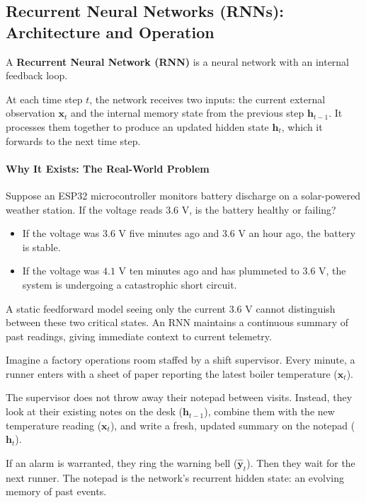 \subsection{Recurrent Neural Networks (RNNs): Architecture and Operation}\label{subsec:rnn_basics}

\begin{keyidea}
A \textbf{Recurrent Neural Network (RNN)} is a neural network with an internal feedback loop. 

At each time step $t$, the network receives two inputs: the current external observation $\mathbf{x}_t$ and the internal memory state from the previous step $\mathbf{h}_{t-1}$. It processes them together to produce an updated hidden state $\mathbf{h}_t$, which it forwards to the next time step.
\end{keyidea}

\paragraph{Why It Exists: The Real-World Problem}
Suppose an ESP32 microcontroller monitors battery discharge on a solar-powered weather station. If the voltage reads $3.6\text{ V}$, is the battery healthy or failing? 
\begin{itemize}
    \item If the voltage was $3.6\text{ V}$ five minutes ago and $3.6\text{ V}$ an hour ago, the battery is stable.
    \item If the voltage was $4.1\text{ V}$ ten minutes ago and has plummeted to $3.6\text{ V}$, the system is undergoing a catastrophic short circuit.
\end{itemize}
A static feedforward model seeing only the current $3.6\text{ V}$ cannot distinguish between these two critical states. An RNN maintains a continuous summary of past readings, giving immediate context to current telemetry.

\begin{analogy}
Imagine a factory operations room staffed by a shift supervisor. Every minute, a runner enters with a sheet of paper reporting the latest boiler temperature ($\mathbf{x}_t$). 

The supervisor does not throw away their notepad between visits. Instead, they look at their existing notes on the desk ($\mathbf{h}_{t-1}$), combine them with the new temperature reading ($\mathbf{x}_t$), and write a fresh, updated summary on the notepad ($\mathbf{h}_t$). 

If an alarm is warranted, they ring the warning bell ($\hat{\mathbf{y}}_t$). Then they wait for the next runner. The notepad is the network's recurrent hidden state: an evolving memory of past events.
\end{analogy}

